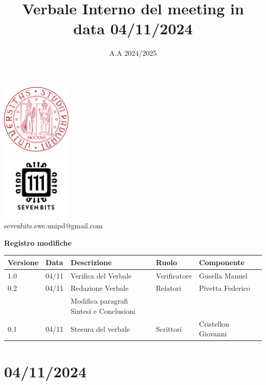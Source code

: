 \documentclass[12pt]{article}
\title{Verbale Interno del meeting in data 04/11/2024}
\date{A.A 2024/2025}
\begin{document}
\maketitle
\begin{center}
\includegraphics[width=0.25\textwidth]{LogoUnipd}\\
\includegraphics[width=0.25\textwidth]{Sevenbitslogo}\\
sevenbits.swe.unipd@gmail.com\\
\vspace{2mm}

\textbf{Registro modifiche}\\
\vspace{2mm}
\begin{tabular}{|l|l|l|l|l|l|}
\hline
\textbf{Versione} & \textbf{Data} & \textbf{Descrizione} & \textbf{Ruolo} & \textbf{Componente} \\
\hline
1.0 & 04/11 & Verifica del Verbale & Verificatore & Gusella Manuel\\
\hline
0.2 & 04/11 & Redazione Verbale & Relatori & Pivetta Federico\\
& & Modifica paragrafi Sintesi e Conclusioni & & \\
\hline
0.1 & 04/11 & Stesura del verbale & Scrittori & Cristellon Giovanni\\
\hline
\end{tabular}
\end{center}
\newpage
\tableofcontents
\newpage
\section{04/11/2024}
\end{document}
